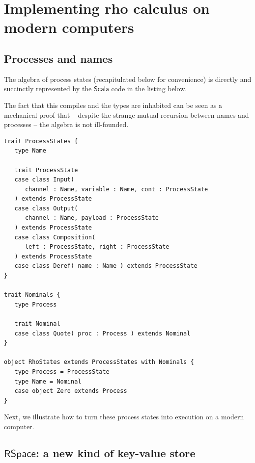 \section{Implementing rho calculus on modern computers}

\subsection{Processes and names}
The algebra of process states (recapitulated below for convenience) is
directly and succinctly represented by the $\mathsf{Scala}$ code in
the listing below.


The fact that this compiles and the types are inhabited can be seen as
a mechanical proof that -- despite the strange mutual recursion
between names and processes -- the algebra is not ill-founded.

\begin{lstlisting}
trait ProcessStates {
   type Name

   trait ProcessState
   case class Input(
      channel : Name, variable : Name, cont : ProcessState
   ) extends ProcessState
   case class Output(
      channel : Name, payload : ProcessState
   ) extends ProcessState
   case class Composition(
      left : ProcessState, right : ProcessState
   ) extends ProcessState
   case class Deref( name : Name ) extends ProcessState
}

trait Nominals {
   type Process

   trait Nominal
   case class Quote( proc : Process ) extends Nominal
}

object RhoStates extends ProcessStates with Nominals {
   type Process = ProcessState
   type Name = Nominal
   case object Zero extends Process
}
\end{lstlisting}

Next, we illustrate how to turn these process states into execution on
a modern computer.

\subsection{$\mathsf{RSpace}$: a new kind of key-value store}

